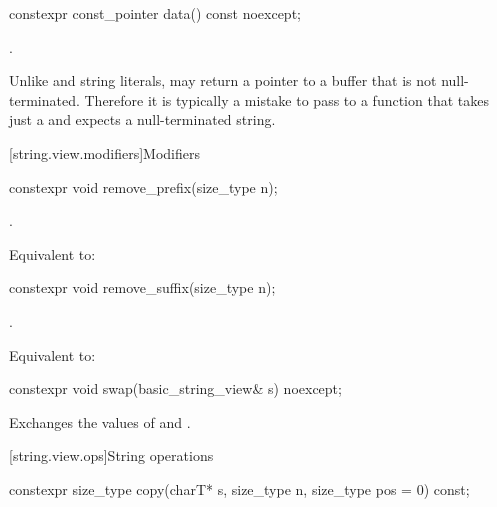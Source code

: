 %
\begin{itemdecl}
constexpr const_pointer data() const noexcept;
\end{itemdecl}

\begin{itemdescr}
\pnum
\returns
{}.

\pnum
\begin{note}
Unlike  and string literals,
 may return a pointer to a buffer that is not null-terminated.
Therefore it is typically a mistake to pass  to a function that takes just a  and expects a null-terminated string.
\end{note}
\end{itemdescr}

[string.view.modifiers]{Modifiers}

%
\begin{itemdecl}
constexpr void remove_prefix(size_type n);
\end{itemdecl}

\begin{itemdescr}
\pnum
\requires
{}.

\pnum
\effects
Equivalent to: 
\end{itemdescr}

%
\begin{itemdecl}
constexpr void remove_suffix(size_type n);
\end{itemdecl}

\begin{itemdescr}
\pnum
\requires
{}.

\pnum
\effects
Equivalent to: 
\end{itemdescr}

%
\begin{itemdecl}
constexpr void swap(basic_string_view& s) noexcept;
\end{itemdecl}

\begin{itemdescr}
\pnum
\effects
Exchanges the values of  and .
\end{itemdescr}

[string.view.ops]{String operations}

%
\begin{itemdecl}
constexpr size_type copy(charT* s, size_type n, size_type pos = 0) const;
\end{itemdecl}

